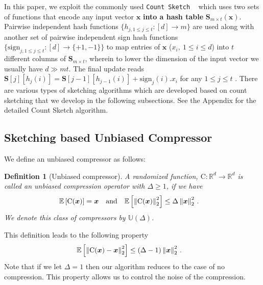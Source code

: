\documentclass[11pt]{article}
\newtheorem{definition}{Definition}
\begin{document}
In this paper, we exploit the commonly used \texttt{Count Sketch} ~\citep{DBLP:journals/tcs/CharikarCF04} which uses two sets of functions that encode any input vector $\boldsymbol{x}$ \textbf{into a hash table} $\boldsymbol{S}_{m\times t}(\boldsymbol{x})$. 
Pairwise independent hash functions $\{h_{j,1\leq j\leq t }:[d]\rightarrow m\}$ are used along with another set of pairwise independent sign hash functions $\{\text{sign}_{j,1\leq j\leq t}: [d]\rightarrow \{+1,-1\}\}$ to map entries of $\boldsymbol{x}$ (${x}_i, \:1\leq i\leq d$) into $t$ different columns of $\mathbf{S}_{m\times t}$, wherein to lower the dimension of the input vector we usually have $d\gg mt$.  
The final update reads $\mathbf{S}[j][h_j(i)]=\mathbf{S}[j-1][h_{j-1}(i)]+\text{sign}_j(i).{x}_i$ for any $1 \leq j \leq t$ .
There are various types of sketching algorithms which are developed based on count sketching that we develop in the following subsections. 
See the Appendix for the detailed Count Sketch algorithm. 




\vspace{-0.05in}
\subsection{Sketching based Unbiased Compressor}
\vspace{-0.05in}



We define an unbiased compressor as follows:
\begin{definition}[Unbiased compressor]\label{def:unbiased}
A randomized function, $\text{C}:\mathbb{R}^{d}\rightarrow\mathbb{R}^{d}$ is called an unbiased compression operator with $\Delta\geq 1$, if we have 
\begin{align}\notag
\mathbb{E}\left[\text{C}(\boldsymbol{x})\right]&=\boldsymbol{x}\nonumber \quad \textrm{and} \quad    \mathbb{E}\left[\left\|\text{C}(\boldsymbol{x})\right\|^2_2\right] \leq \Delta\left\|\boldsymbol{x}\right\|^2_2\notag \, .
\end{align}
We denote this class of compressors by $\mathbb{U}(\Delta)$.
\end{definition}
This definition leads to the following property 
\begin{align}\notag
    \mathbb{E}\left[\left\|\text{C}(\boldsymbol{x})-\boldsymbol{x}\right\|^2_2\right]&\leq \left(\Delta-1\right)\left\|\boldsymbol{x}\right\|^2_2\, .
\end{align}
Note that if we let $\Delta=1$ then our algorithm reduces to the case of no compression. 
This property allows us to control the noise of the compression.
\end{document}
